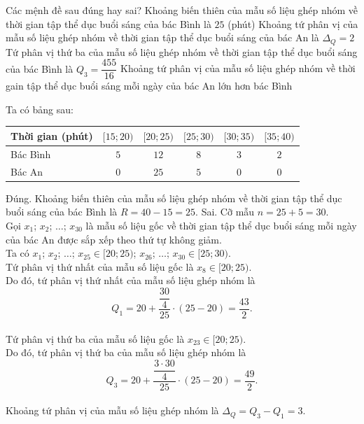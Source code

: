 \begin{ex}
\begin{center}
	\end{center}
	Các mệnh đề sau đúng hay sai?
	\choiceTF
	{\True Khoảng biến thiên của mẫu số liệu ghép nhóm về thời gian tập thể dục buổi sáng của bác Bình là $25$ (phút)}
	{Khoảng tứ phân vị của mẫu số liệu ghép nhóm về thời gian tập thể dục buổi sáng của bác An là $\Delta_Q = 2$}
	{\True Tứ phân vị thứ ba của mẫu số liệu ghép nhóm về thời gian tập thể dục buổi sáng của bác Bình là $Q_3 = \dfrac{455}{16}$}
	{Khoảng tứ phân vị của mẫu số liệu ghép nhóm về thời gain tập thể dục buổi sáng mỗi ngày của bác An lớn hơn bác Bình}
	\loigiai
	{Ta có bảng sau:
		\begin{center}
			\begin{tabular}{|>{\centering\arraybackslash}m{4cm}|c|c|c|c|c|}
				\hline
				Thời gian (phút) & $[15; 20)$ & $[20; 25)$ & $[25; 30)$ & $[30; 35)$ & $[35; 40)$ \\ \hline
				Bác Bình & $5$ & $12$ & $8$ & $3$ & $2$ \\ \hline
				Bác An & $0$ &$25$ & $5$ & $0$ & $0$ \\ \hline
			\end{tabular}
		\end{center}
		\begin{itemchoice}
			\itemch Đúng. Khoảng biến thiên của mẫu số liệu ghép nhóm về thời gian tập thể dục buổi sáng của bác Bình là $R = 40-15 = 25$. 
			\itemch Sai. Cỡ mẫu $n = 25 + 5= 30$. \\
			Gọi $x_1$; $x_2$; $\ldots$; $x_{30}$ là mẫu số liệu gốc về thời gian tập thể dục buổi sáng mỗi ngày của bác An được sắp xếp theo thứ tự không giảm.\\
			Ta có $x_1$; $x_2$; $\ldots$; $x_{25} \in [20; 25)$; $x_{26}$; $\ldots$; $x_{30} \in [25; 30)$. \\
			Tứ phân vị thứ nhất của mẫu số liệu gốc là $x_8 \in [20; 25)$. \\
			Do đó, tứ phân vị thứ nhất của mẫu số liệu ghép nhóm là 
			\[Q_1 = 20 + \dfrac{\dfrac{30}{4}}{25} \cdot (25 - 20) = \dfrac{43}{2}.\]  \\
			Tứ phân vị thứ ba của mẫu số liệu gốc là $x_{23} \in [20; 25)$. \\
			Do đó, tứ phân vị thứ ba của mẫu số liệu ghép nhóm là 
			\[Q_3 = 20 + \dfrac{\dfrac{3 \cdot 30}{4}}{25} \cdot (25- 20) =\dfrac{49}{2}.\] \\
			Khoảng tứ phân vị của mẫu số liệu ghép nhóm là $\Delta_Q = Q_3 - Q_1 = 3$.

\end{itemchoice}}
\end{ex}
